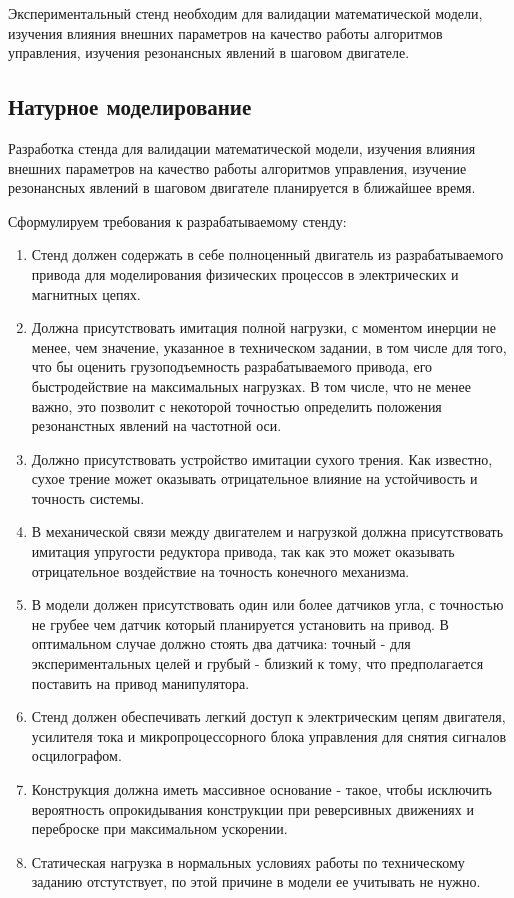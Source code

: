 \ifdefined\DIPLOMA
    Экспериментальный стенд необходим для валидации математической модели,
    изучения влияния внешних параметров на качество работы алгоритмов управления,
    изучения резонансных явлений в шаговом двигателе.
\else
    \subsection{Натурное моделирование}
    Разработка стенда для валидации математической модели, изучения влияния внешних параметров
    на качество работы алгоритмов управления, изучение резонансных явлений в шаговом
    двигателе планируется в ближайшее время.
\fi

Сформулируем требования к разрабатываемому стенду:

\begin{enumerate}
    \item Стенд должен содержать в себе полноценный двигатель из разрабатываемого
    привода для моделирования физических процессов в электрических и магнитных цепях.

    \item Должна присутствовать имитация полной нагрузки, с моментом инерции не менее, чем
    значение, указанное в техническом задании, в том числе для того, что бы оценить
    грузоподъемность разрабатываемого привода, его быстродействие на максимальных
    нагрузках. В том числе, что не менее важно, это позволит с некоторой точностью
    определить положения резонанстных явлений на частотной оси.

    \item Должно присутствовать устройство имитации сухого трения. Как
    известно, сухое трение может оказывать отрицательное влияние на устойчивость
    и точность системы.

    \item В механической связи между двигателем и нагрузкой должна присутствовать имитация
    упругости редуктора привода, так как это может оказывать отрицательное воздействие
    на точность конечного механизма.

    \item В модели должен присутствовать один или более датчиков угла, с точностью не
    грубее чем датчик который планируется установить на привод. В оптимальном случае должно
    стоять два датчика: точный - для экспериментальных целей и грубый - близкий
    к тому, что предполагается поставить на привод манипулятора.

    \item Стенд должен обеспечивать легкий доступ к электрическим цепям двигателя,
    усилителя тока и микропроцессорного блока управления для снятия сигналов
    осцилографом.

    \item Конструкция должна иметь массивное основание - такое, чтобы
    исключить вероятность опрокидывания конструкции при реверсивных движениях
    и переброске при максимальном ускорении.

    \item Статическая нагрузка в нормальных условиях работы по техническому
    заданию отстутствует, по этой причине в модели ее учитывать не нужно.
\end{enumerate}

